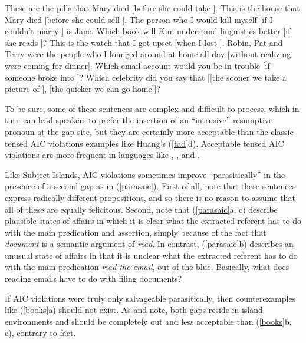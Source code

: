\documentclass[output=paper
 	        ,biblatex
                ,babelshorthands
                ,newtxmath
                ,draftmode
                ,colorlinks, citecolor=brown
]{langscibook}
\begin{document}
 

\ealnoraggedright
\label{gr}
\ex These are the pills that Mary died [before she could take \spc].
\ex This is the house that Mary died [before she could sell \spc].
\ex The person who I would kill myself [if I couldn't marry \spc] is Jane.
\ex Which book  will Kim understand linguistics better [if she reads \spc]?
\ex This is the watch that I got upset [when I lost \spc].
\ex Robin, Pat and Terry were the people who I lounged around at home all day [without realizing were \spcs coming for dinner].
\ex Which email account would you be in trouble [if someone broke into \spc]?
\ex Which celebrity did you say that [[the sooner we take a picture of \spc ], [the quicker we can go home]]?
\zl

\noindent 
To be sure, some of these sentences are complex and difficult to process, which in turn can lead
speakers to prefer the insertion of an ``intrusive'' resumptive pronoun at the gap site, but they
are certainly more acceptable than the classic tensed AIC violations examples like Huang's
(\ref{tad}d).  Acceptable tensed AIC violations are more frequent in languages like ,
, and .

Like Subject Islands, AIC violations sometimes improve ``parasitically'' in the presence of a second
gap as in (\ref{parasaic}). First of all, note that these sentences express radically different
propositions, and so there is no reason to assume that all of these are equally felicitous.  Second,
note that (\ref{parasaic}a, c) describe plausible states of affairs in which it is clear what the
extracted referent has to do with the main predication and assertion, simply because of the fact
that \emph{document} is a semantic argument of \emph{read}.  In contrast, (\ref{parasaic}b)
describes an unusual state of affairs in that it is unclear what the extracted referent has to do
with the main predication \emph{read the email}, out of the blue. Basically, what does reading
emails have to do with filing documents?

\eal \label{parasaic}
\zl

\noindent
If AIC violations were truly only salvageable parasitically, then counterexamples like
(\ref{books}a) should not exist.  As \citet{Levine:Sag:03} and \citet[256]{levhubook} note, both
gaps reside in island environments and should be completely out and less acceptable than
(\ref{books}b, c), contrary to fact.
\end{document}
